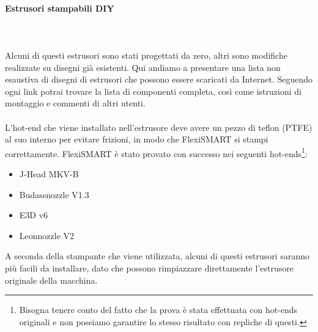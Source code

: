 \documentclass[11pt,a4paper]{article}
\begin{document}
			\paragraph{Estrusori stampabili DIY}
\mbox{}\\\\
Alcuni di questi estrusori sono stati progettati da zero, altri sono modifiche realizzate su disegni già esistenti. Qui andiamo a presentare una lista non esaustiva di disegni di estrusori che possono essere scaricati da Internet. Seguendo ogni link potrai trovare la lista di componenti completa, così come istruzioni di montaggio e commenti di altri utenti. 
\\\\
L'hot-end che viene installato nell'estrusore deve avere un pezzo di teflon (PTFE) al suo interno per evitare frizioni, in modo che FlexiSMART si stampi correttamente. FlexiSMART è stato provato con successo nei seguenti hot-ends\footnote{Bisogna tenere conto del fatto che la prova è stata effettuata con hot-ends originali e non possiamo garantire lo stesso risultato con repliche di questi.}:
\begin{itemize}
\item J-Head MKV-B
\item Budassnozzle V1.3
\item E3D v6
\item Leonnozzle V2
\end{itemize}
A seconda della stampante che viene utilizzata, alcuni di questi estrusori saranno più facili da installare, dato che possono rimpiazzare direttamente l'estrusore originale della macchina.
\end{document}
